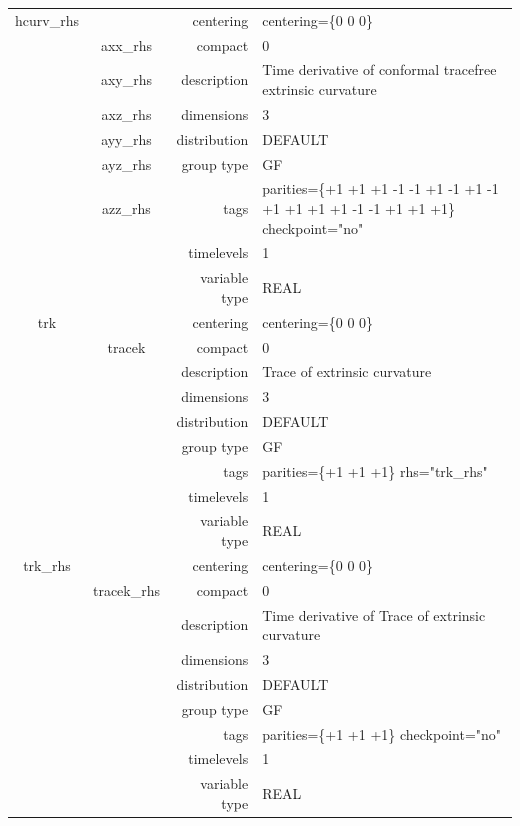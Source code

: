 \begin{tabular*}{150mm}{|c|c@{\extracolsep{\fill}}|rl|}
\hline 
hcurv\_rhs &  & centering & centering=\{0 0 0\} \\ 
 & axx\_rhs & compact & 0 \\ 
 & axy\_rhs & description & Time derivative of conformal tracefree extrinsic curvature \\ 
 & axz\_rhs & dimensions & 3 \\ 
 & ayy\_rhs & distribution & DEFAULT \\ 
 & ayz\_rhs & group type & GF \\ 
 & azz\_rhs & tags & parities=\{+1 +1 +1   -1 -1 +1   -1 +1 -1   +1 +1 +1   +1 -1 -1   +1 +1 +1\}  checkpoint="no" \\ 
 &  & timelevels & 1 \\ 
 &  & variable type & REAL \\ 
\hline 
trk &  & centering & centering=\{0 0 0\} \\ 
 & tracek & compact & 0 \\ 
 &  & description & Trace of extrinsic curvature \\ 
 &  & dimensions & 3 \\ 
 &  & distribution & DEFAULT \\ 
 &  & group type & GF \\ 
 &  & tags & parities=\{+1 +1 +1\}  rhs="trk\_rhs" \\ 
 &  & timelevels & 1 \\ 
 &  & variable type & REAL \\ 
\hline 
trk\_rhs &  & centering & centering=\{0 0 0\} \\ 
 & tracek\_rhs & compact & 0 \\ 
 &  & description & Time derivative of Trace of extrinsic curvature \\ 
 &  & dimensions & 3 \\ 
 &  & distribution & DEFAULT \\ 
 &  & group type & GF \\ 
 &  & tags & parities=\{+1 +1 +1\}  checkpoint="no" \\ 
 &  & timelevels & 1 \\ 
 &  & variable type & REAL \\ 
\hline 
\end{tabular*} 



\vspace{5mm}
\vspace{5mm}

